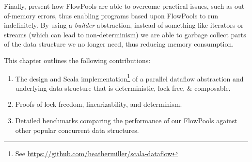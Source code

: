 Finally, present how FlowPools are able to overcome practical issues, such as
out-of-memory errors, thus enabling programs based upon FlowPools to run
indefinitely. By using a \textit{builder} abstraction, instead of something like
iterators or streams (which can lead to non-determinism) we are able to garbage
collect parts of the data structure we no longer need, thus reducing memory
consumption.

This chapter outlines the following contributions:
\begin{enumerate}
\item The design and Scala implementation\footnote{See \url{https://github.com/heathermiller/scala-dataflow}}
of a parallel dataflow abstraction and underlying data structure that
is deterministic, lock-free, \& composable.
\item Proofs of lock-freedom, linearizability, and determinism.
\item Detailed benchmarks comparing the performance of our FlowPools against
other popular concurrent data structures.
\end{enumerate}





